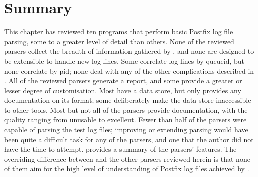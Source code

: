 \newpage{}

\section{Summary}

This chapter has reviewed ten programs that perform basic Postfix log file
parsing, some to a greater level of detail than others.  None of the
reviewed parsers collect the breadth of information gathered by
\parsername{}, and none are designed to be extensible to handle new log
lines.  Some correlate log lines by queueid, but none correlate by pid;
none deal with any of the other complications described in
.  All of the reviewed parsers generate a
report, and some provide a greater or lesser degree of customisation.  Most
have a data store, but only  provides any documentation on its
format; some deliberately make the data store inaccessible to other tools.
Most but not all of the parsers provide documentation, with the quality
ranging from unusable to excellent.  Fewer than half of the parsers were
capable of parsing the \numberOFlogFILES{} test log files; improving or
extending parsing would have been quite a difficult task for any of the
parsers, and one that the author did not have the time to attempt.
 provides a summary of the parsers'
features.  The overriding difference between \parsername{} and the other
parsers reviewed herein is that none of them aim for the high level of
understanding of Postfix log files achieved by \parsername{}.



